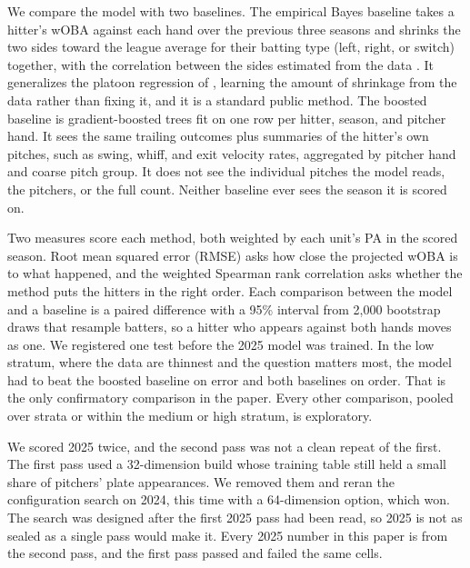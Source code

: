 \documentclass[11pt,letterpaper]{article}
\begin{document}
We compare the model with two baselines. The empirical Bayes baseline takes a hitter's wOBA against each hand over the previous three seasons and shrinks the two sides toward the league average for their batting type (left, right, or switch) together, with the correlation between the sides estimated from the data \citep{efron1972}. It generalizes the platoon regression of \citet{tango2007}, learning the amount of shrinkage from the data rather than fixing it, and it is a standard public method. The boosted baseline is gradient-boosted trees \citep{chen2016} fit on one row per hitter, season, and pitcher hand. It sees the same trailing outcomes plus summaries of the hitter's own pitches, such as swing, whiff, and exit velocity rates, aggregated by pitcher hand and coarse pitch group. It does not see the individual pitches the model reads, the pitchers, or the full count. Neither baseline ever sees the season it is scored on.

Two measures score each method, both weighted by each unit's PA in the scored season. Root mean squared error (RMSE) asks how close the projected wOBA is to what happened, and the weighted Spearman rank correlation asks whether the method puts the hitters in the right order. Each comparison between the model and a baseline is a paired difference with a 95\% interval from 2,000 bootstrap draws that resample batters, so a hitter who appears against both hands moves as one. We registered one test before the 2025 model was trained. In the low stratum, where the data are thinnest and the question matters most, the model had to beat the boosted baseline on error and both baselines on order. That is the only confirmatory comparison in the paper. Every other comparison, pooled over strata or within the medium or high stratum, is exploratory.

We scored 2025 twice, and the second pass was not a clean repeat of the first. The first pass used a 32-dimension build whose training table still held a small share of pitchers' plate appearances. We removed them and reran the configuration search on 2024, this time with a 64-dimension option, which won. The search was designed after the first 2025 pass had been read, so 2025 is not as sealed as a single pass would make it. Every 2025 number in this paper is from the second pass, and the first pass passed and failed the same cells.
\end{document}
